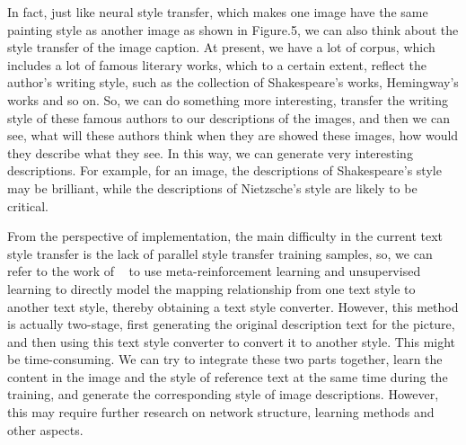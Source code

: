 \documentclass[12pt]{article}
\begin{document}
	
	In fact, just like neural style transfer, which makes one image have the same painting style as another image as shown in Figure.5, we can also think about the style transfer of the image caption. At present, we have a lot of corpus, which includes a lot of famous literary works, which to a certain extent, reflect the author's writing style, such as the collection of Shakespeare's works, Hemingway's works and so on. So, we can do something more interesting, transfer the writing style of these famous authors to our descriptions of the images, and then we can see, what will these authors think when they are showed these images, how would they describe what they see. In this way, we can generate very interesting descriptions. For example, for an image, the descriptions of Shakespeare's style may be brilliant, while the descriptions of Nietzsche's style are likely to be critical. \par
	From the perspective of implementation, the main difficulty in the current text style transfer is the lack of parallel style transfer training samples, so, we can refer to the work of ~\cite{luo2019dual} to use meta-reinforcement learning and unsupervised learning to directly model the mapping relationship from one text style to another text style, thereby obtaining a text style converter. However, this method is actually two-stage, first generating the original description text for the picture, and then using this text style converter to convert it to another style. This might be time-consuming. We can try to integrate these two parts together, learn the content in the image and the style of reference text at the same time during the training, and generate the corresponding style of image descriptions. However, this may require further research on network structure, learning methods and other aspects.  \par
	
\end{document}
